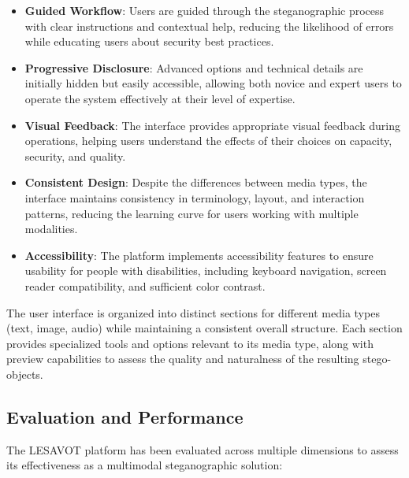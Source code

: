 \documentclass[12pt, a4paper, oneside]{book}
\begin{document}
\begin{itemize}[leftmargin=*]
    \item \textbf{Guided Workflow}: Users are guided through the steganographic process with clear instructions and contextual help, reducing the likelihood of errors while educating users about security best practices.

    \item \textbf{Progressive Disclosure}: Advanced options and technical details are initially hidden but easily accessible, allowing both novice and expert users to operate the system effectively at their level of expertise.

    \item \textbf{Visual Feedback}: The interface provides appropriate visual feedback during operations, helping users understand the effects of their choices on capacity, security, and quality.

    \item \textbf{Consistent Design}: Despite the differences between media types, the interface maintains consistency in terminology, layout, and interaction patterns, reducing the learning curve for users working with multiple modalities.

    \item \textbf{Accessibility}: The platform implements accessibility features to ensure usability for people with disabilities, including keyboard navigation, screen reader compatibility, and sufficient color contrast.
\end{itemize}

The user interface is organized into distinct sections for different media types (text, image, audio) while maintaining a consistent overall structure. Each section provides specialized tools and options relevant to its media type, along with preview capabilities to assess the quality and naturalness of the resulting stego-objects.

\subsection{Evaluation and Performance}
The LESAVOT platform has been evaluated across multiple dimensions to assess its effectiveness as a multimodal steganographic solution:
\end{document}
